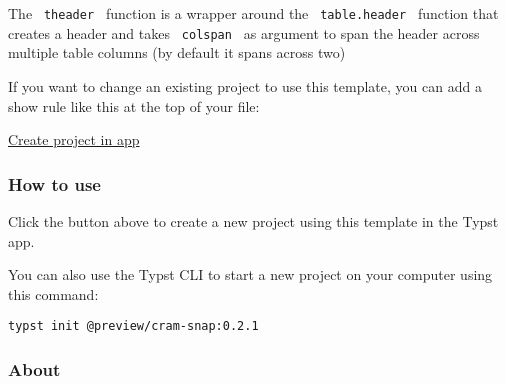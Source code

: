 The \texttt{\ theader\ } function is a wrapper around the
\texttt{\ table.header\ } function that creates a header and takes
\texttt{\ colspan\ } as argument to span the header across multiple
table columns (by default it spans across two)

If you want to change an existing project to use this template, you can
add a show rule like this at the top of your file:

\begin{Shaded}
\begin{Highlighting}[]


\NormalTok{)}


\NormalTok{)}
\end{Highlighting}
\end{Shaded}

\href{/app?template=cram-snap&version=0.2.1}{Create project in app}

\subsubsection{How to use}\label{how-to-use}

Click the button above to create a new project using this template in
the Typst app.

You can also use the Typst CLI to start a new project on your computer
using this command:

\begin{verbatim}
typst init @preview/cram-snap:0.2.1
\end{verbatim}



\subsubsection{About}\label{about}

